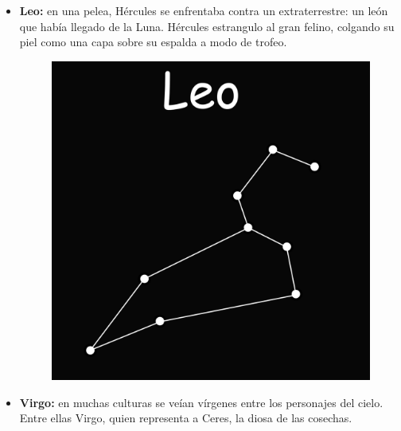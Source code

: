 \documentclass[10pt,a4paper]{article}
\begin{document}
\begin{itemize}
 \item \textbf{Leo:} en una pelea, Hércules se enfrentaba contra un extraterrestre: un león que había llegado de la Luna. Hércules estrangulo al gran felino, colgando su piel como una capa sobre su espalda a modo de trofeo.

\begin{figure}[H]
\centering
\includegraphics[scale=0.18]{Imagenes/Leo_01}
\end{figure}  

 \item \textbf{Virgo:} en muchas culturas se veían vírgenes entre los personajes del cielo. Entre ellas Virgo, quien representa a Ceres, la diosa de las cosechas.
 

\end{itemize}
\end{document}
